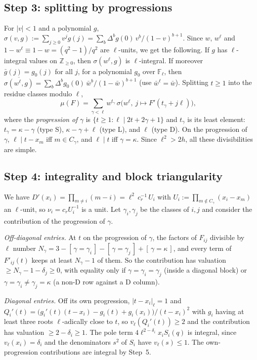 \documentclass[11pt]{amsart}
\theoremstyle{definition}
\theoremstyle{remark}
\numberwithin{equation}{section}
\newcommand{\ZZ}{\mathbb{Z}}
\newcommand{\FF}{\mathbb{F}}
\newcommand{\ind}[1]{[\,#1\,]}
\begin{document}
\subsection{Step 3: splitting by progressions}
For $|v|<1$ and a polynomial $g$, $\sigma(v,g):=\sum_{j\ge0}v^jg(j)=\sum_b\Delta^bg(0)\,v^b/(1-v)^{b+1}$. Since $w$, $w^\ell$ and
$1-w^\ell\equiv1-w=(q^2-1)/q^2$ are $\ell$-units, we get the following. If $g$ has $\ell$-integral values on $\ZZ_{\ge0}$, then
$\sigma(w^\ell,g)$ is $\ell$-integral. If moreover $\bar g(j)=g_0(j)$ for all $j$, for a polynomial $g_0$ over $\FF_\ell$, then
$\overline{\sigma(w^\ell,g)}=\sum_b\Delta^bg_0(0)\,\bar w^b/(1-\bar w)^{b+1}$ (use $\bar w^\ell=\bar w$). Splitting $t\ge1$ into the
residue classes modulo $\ell$,
\[
  \mu(F)=\sum_{\gamma<\ell}w^{t_\gamma}\,\sigma\bigl(w^\ell,\ j\mapsto F'(t_\gamma+j\ell)\bigr),
\]
where the \emph{progression of $\gamma$} is $\{t\ge1:\ell\mid2t+2\gamma+1\}$ and $t_\gamma$ is its least element: $t_\gamma=\kappa-\gamma$
(type S), $\kappa-\gamma+\ell$ (type L), and $\ell$ (type D). On the progression of $\gamma$, $\ell\mid t-x_m$ iff $m\in C_\gamma$,
and $\ell\mid t$ iff $\gamma=\kappa$. Since $\ell^2>2h$, all these divisibilities are simple.

\subsection{Step 4: integrality and block triangularity}
We have $D'(x_i)=\prod_{m\ne i}(m-i)=\ell^2\,c_r^{-1}\,U_i$ with $U_i:=\prod_{m\notin C_\gamma}(x_i-x_m)$ an $\ell$-unit, so
$\nu_i=c_rU_i^{-1}$ is a unit. Let $\gamma_i,\gamma_j$ be the classes of $i,j$ and consider the contribution of the
progression of $\gamma$.

\emph{Off-diagonal entries.} At $t$ on the progression of $\gamma$, the factors of $F_{ij}$ divisible by $\ell$ number
$N_\gamma=3-\ind{\gamma=\gamma_i}-\ind{\gamma=\gamma_j}+\ind{\gamma=\kappa}$, and every term of $F'_{ij}(t)$ keeps at least $N_\gamma-1$ of
them. So the contribution has valuation $\ge N_\gamma-1-\delta_j\ge0$, with equality only if $\gamma=\gamma_i=\gamma_j$ (inside a
diagonal block) or $\gamma=\gamma_i\ne\gamma_j=\kappa$ (a non-D row against a D column).

\emph{Diagonal entries.} Off its own progression, $|t-x_i|_\ell=1$ and
$Q_i'(t)=\bigl(g_i'(t)(t-x_i)-g_i(t)+g_i(x_i)\bigr)/(t-x_i)^2$ with $g_i$ having at least three roots $\ell$-adically close to $t$,
so $v_\ell(Q_i'(t))\ge2$ and the contribution has valuation $\ge2-\delta_i\ge1$. The pole term
$4\ell^{2-\delta_i}x_iS_i(q)$ is integral, since $v_\ell(x_i)=\delta_i$ and the denominators $s^2$ of $S_i$ have $v_\ell(s)\le1$.
The own-progression contributions are integral by Step~5.
\end{document}
